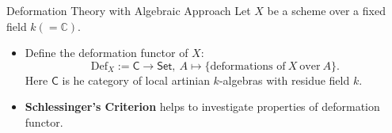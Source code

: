 \documentclass{beamer}
\theoremstyle{definition}
\newtheorem{defn}{Definition}
\theoremstyle{plain}
\begin{document}
\begin{frame}{Deformation Theory with Algebraic Approach}
    Let $ X $ be a scheme over a fixed field $ k(=\mathbb{C} ) $.
    \begin{itemize}
        \item Define the deformation functor of $ X $:
        \[
        \text{Def}_X:= \mathsf{C} \to \mathsf{Set},\ A \mapsto \{\text{deformations of}\ X\ \text{over}\ A\}.
        \]Here $ \mathsf{C} $ is he category of local artinian $ k $-algebras with residue field $ k $.
        \pause
        \item \textbf{Schlessinger's Criterion} helps to investigate properties of deformation functor.
    \end{itemize}
\end{frame}



\end{document}

